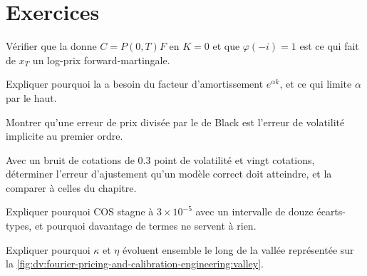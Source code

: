 \section{Exercices}

\begin{exercise}[$\star$]\label{exo:dv:fourier-pricing-and-calibration-engineering:1}
Vérifier que la  donne $C=P(0,T)F$ en $K=0$ et que $\varphi(-i)=1$ est ce qui fait de $x_T$ un log-prix forward-martingale.
\end{exercise}

\begin{exercise}[$\star$]\label{exo:dv:fourier-pricing-and-calibration-engineering:2}
Expliquer pourquoi la  a besoin du facteur d'amortissement $e^{\alpha k}$, et ce qui limite $\alpha$ par le haut.
\end{exercise}

\begin{exercise}[$\star$]\label{exo:dv:fourier-pricing-and-calibration-engineering:3}
Montrer qu'une erreur de prix divisée par le  de Black est l'erreur de volatilité implicite au premier ordre.
\end{exercise}

\begin{exercise}[$\star\star$]\label{exo:dv:fourier-pricing-and-calibration-engineering:4}
Avec un bruit de cotations de 0.3 point de volatilité et vingt cotations, déterminer l'erreur d'ajustement qu'un modèle correct doit atteindre, et la comparer à celles du chapitre.
\end{exercise}

\begin{exercise}[$\star\star$]\label{exo:dv:fourier-pricing-and-calibration-engineering:5}
Expliquer pourquoi COS stagne à $3\times10^{-5}$ avec un intervalle de douze écarts-types, et pourquoi davantage de termes ne servent à rien.
\end{exercise}

\begin{exercise}[$\star\star$]\label{exo:dv:fourier-pricing-and-calibration-engineering:6}
Expliquer pourquoi $\kappa$ et $\eta$ évoluent ensemble le long de la vallée représentée sur la \cref{fig:dv:fourier-pricing-and-calibration-engineering:valley}.
\end{exercise}

